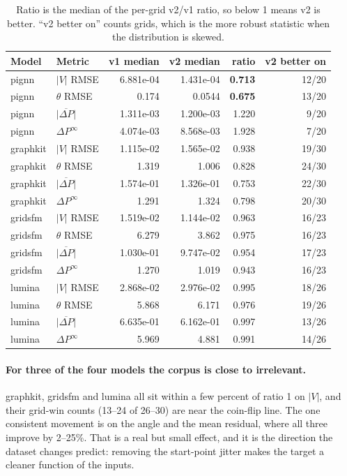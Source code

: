 \documentclass[10pt]{article}
\begin{document}
\begin{table}[H]
\centering\small
\begin{tabular}{llrrrr}
\toprule
Model & Metric & v1 median & v2 median & ratio & v2 better on \\
\midrule
pignn    & $|V|$ RMSE              & 6.881e-04 & 1.431e-04 & \textbf{0.713} & 12/20 \\
pignn    & $\theta$ RMSE           & 0.174     & 0.0544    & \textbf{0.675} & 13/20 \\
pignn    & $\overline{|\Delta P|}$ & 1.311e-03 & 1.200e-03 & 1.220 & 9/20 \\
pignn    & $\Delta P^{\infty}$     & 4.074e-03 & 8.568e-03 & 1.928 & 7/20 \\
\midrule
graphkit & $|V|$ RMSE              & 1.115e-02 & 1.565e-02 & 0.938 & 19/30 \\
graphkit & $\theta$ RMSE           & 1.319     & 1.006     & 0.828 & 24/30 \\
graphkit & $\overline{|\Delta P|}$ & 1.574e-01 & 1.326e-01 & 0.753 & 22/30 \\
graphkit & $\Delta P^{\infty}$     & 1.291     & 1.324     & 0.798 & 20/30 \\
\midrule
gridsfm  & $|V|$ RMSE              & 1.519e-02 & 1.144e-02 & 0.963 & 16/23 \\
gridsfm  & $\theta$ RMSE           & 6.279     & 3.862     & 0.975 & 16/23 \\
gridsfm  & $\overline{|\Delta P|}$ & 1.030e-01 & 9.747e-02 & 0.954 & 17/23 \\
gridsfm  & $\Delta P^{\infty}$     & 1.270     & 1.019     & 0.943 & 16/23 \\
\midrule
lumina   & $|V|$ RMSE              & 2.868e-02 & 2.976e-02 & 0.995 & 18/26 \\
lumina   & $\theta$ RMSE           & 5.868     & 6.171     & 0.976 & 19/26 \\
lumina   & $\overline{|\Delta P|}$ & 6.635e-01 & 6.162e-01 & 0.997 & 13/26 \\
lumina   & $\Delta P^{\infty}$     & 5.969     & 4.881     & 0.991 & 14/26 \\
\bottomrule
\end{tabular}
\caption{Ratio is the median of the per-grid v2/v1 ratio, so below 1 means v2 is
better. ``v2 better on'' counts grids, which is the more robust statistic when
the distribution is skewed.}
\end{table}

\paragraph{For three of the four models the corpus is close to irrelevant.}
graphkit, gridsfm and lumina all sit within a few percent of ratio 1 on $|V|$,
and their grid-win counts (13--24 of 26--30) are near the coin-flip line. The
one consistent movement is on the angle and the mean residual, where all three
improve by 2--25\%. That is a real but small effect, and it is the direction the
dataset changes predict: removing the start-point jitter makes the target a
cleaner function of the inputs.
\end{document}
